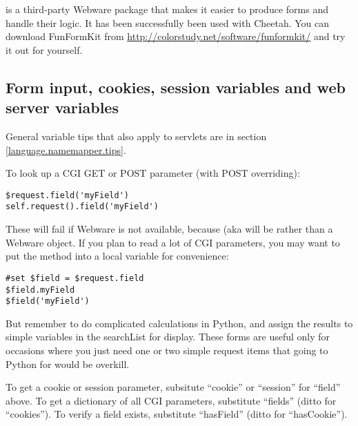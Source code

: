
 is a third-party Webware package that makes it easier to
produce forms and handle their logic.  It has been successfully been used with
Cheetah.  You can download FunFormKit from
\url{http://colorstudy.net/software/funformkit/} and try it out for yourself.


\subsection{Form input, cookies, session variables and web server variables}
\label{webware.input}

General variable tips that also apply to servlets are in section
\ref{language.namemapper.tips}.

To look up a CGI GET or POST parameter (with POST overriding):
\begin{verbatim}
$request.field('myField')     
self.request().field('myField')
\end{verbatim}
These will fail if Webware is not available, because 
(aka  will be  rather than a Webware
 object.  If you plan to read a lot of CGI parameters,
you may want to put the  method into a local variable for
convenience:
\begin{verbatim}
#set $field = $request.field
$field.myField
$field('myField')
\end{verbatim}
But remember to do complicated calculations in Python, and assign the results
to simple variables in the searchList for display.  These 
forms are useful only for occasions where you just need one or two simple
request items that going to Python for would be overkill.

To get a cookie or session parameter, subsitute ``cookie'' or ``session'' for
``field'' above.  To get a dictionary of all CGI parameters, substitute
``fields'' (ditto for ``cookies'').  To verify a field exists,
substitute ``hasField'' (ditto for ``hasCookie'').  

